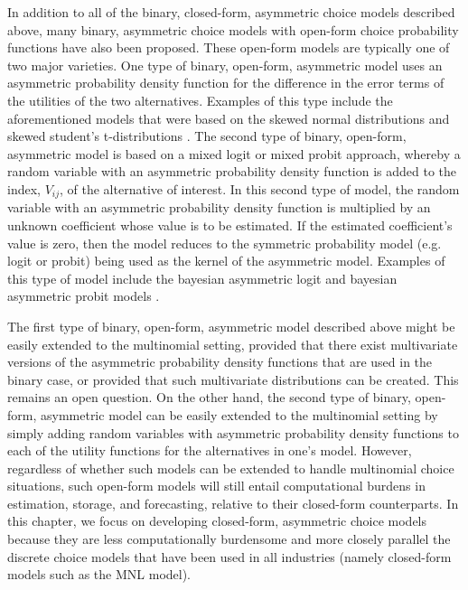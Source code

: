 In addition to all of the binary, closed-form, asymmetric choice models described above, many binary, asymmetric choice models with open-form choice probability functions have also been proposed. These open-form models are typically one of two major varieties. One type of binary, open-form, asymmetric model uses an asymmetric probability density function for the difference in the error terms of the utilities of the two alternatives. Examples of this type include the aforementioned models that were based on the skewed normal distributions \citep{bazan_framework_2010} and skewed student's t-distributions \citep{kim_binary_2002, kim_flexible_2008}. The second type of binary, open-form, asymmetric model is based on a mixed logit or mixed probit approach, whereby a random variable with an asymmetric probability density function is added to the index, $V_{ij}$, of the alternative of interest. In this second type of model, the random variable with an asymmetric probability density function is multiplied by an unknown coefficient whose value is to be estimated. If the estimated coefficient's value is zero, then the model reduces to the symmetric probability model (e.g. logit or probit) being used as the kernel of the asymmetric model. Examples of this type of model include the bayesian asymmetric logit and bayesian asymmetric probit models \citep{chen_new_1999}.

The first type of binary, open-form, asymmetric model described above might be easily extended to the multinomial setting, provided that there exist multivariate versions of the asymmetric probability density functions that are used in the binary case, or provided that such multivariate distributions can be created. This remains an open question. On the other hand, the second type of binary, open-form, asymmetric model can be easily extended to the multinomial setting by simply adding random variables with asymmetric probability density functions to each of the utility functions for the alternatives in one's model. However, regardless of whether such models can be extended to handle multinomial choice situations, such open-form models will still entail computational burdens in estimation, storage, and forecasting, relative to their closed-form counterparts. In this chapter, we focus on developing closed-form, asymmetric choice models because they are less computationally burdensome and more closely parallel the discrete choice models that have been used in all industries (namely closed-form models such as the MNL model).

